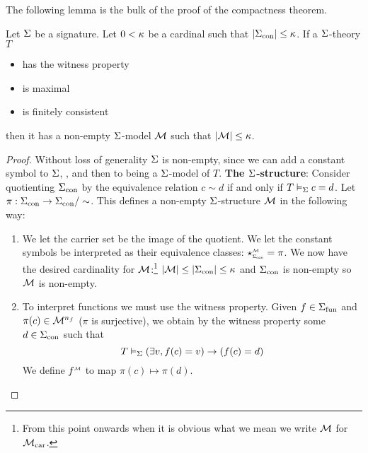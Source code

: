 The following lemma is the bulk of the proof of the compactness theorem.
\begin{lem}
    Let $\Sigma$ be a signature.
    Let $0 < \kappa$ be a cardinal such that $|{\Sigma}_\mathrm{con}| \leq \kappa$.
    If a $\Sigma$-theory $T$ 
    \begin{itemize}
        \item has the witness property
        \item is maximal
        \item is finitely consistent
    \end{itemize}
    then it has a non-empty $\Sigma$-model $\mathcal{M}$ such that $|\mathcal{M}| \leq \kappa$.
\end{lem}
\begin{proof}
    Without loss of generality $\Sigma$ is non-empty, 
    since we can add a constant symbol to $\Sigma$, 
    , and then 
     to 
    being a $\Sigma$-model of $T$.
    \textbf{The $\Sigma$-structure}: 
    Consider quotienting ${\Sigma}_\mathrm{con}$ by the equivalence relation
    $c \sim d$ if and only if $T \vDash_{\Sigma} c = d$.
    Let $\pi : {\Sigma}_\mathrm{con} \to {\Sigma}_\mathrm{con} / \sim $.
    This defines a non-empty $\Sigma$-structure $\mathcal{M}$ in the following way:
    \begin{enumerate}
        \item We let the carrier set be the image of the quotient.
        We let the constant symbols be interpreted as their equivalence classes:
        $\intp{\const{\Si}}{\MM} = \pi$.
        We now have the desired cardinality for $\mathcal{M}$:\footnote{From 
            this point onwards when it is obvious what we mean 
            we write $\mathcal{M}$ for ${\mathcal{M}}_\mathrm{car}$.} 
        $|{\mathcal{M}}| \leq |{\Sigma}_\mathrm{con}| \leq \kappa$
        and ${\Sigma}_\mathrm{con}$ is non-empty so $\mathcal{M}$ is non-empty.
        \item To interpret functions we must use the witness property.
        Given $f \in {\Sigma}_\mathrm{fun}$ and $\pi(c) \in \mathcal{M}^{n_f}$
        ($\pi$ is surjective),
        we obtain by the witness property some $d \in {\Sigma}_\mathrm{con}$
        such that \[T \vDash_{\Sigma} (\exists v, f(c) = v) \to (f(c) = d)\]
        We define $\mmintp{f}$ to map $\pi(c) \mapsto \pi(d)$.
        

\end{enumerate}
\end{proof}
